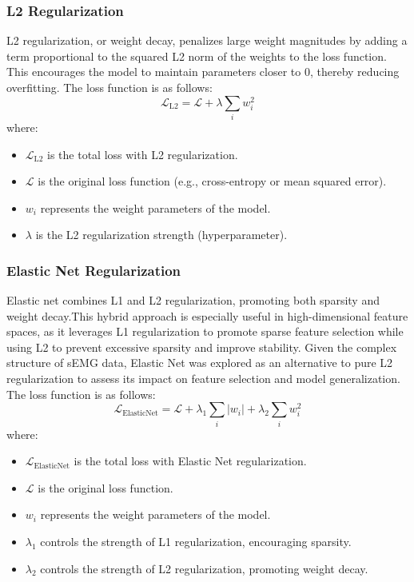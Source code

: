 \documentclass{article}
\begin{document}
\subsubsection{L2 Regularization}
L2 regularization, or weight decay, penalizes large weight magnitudes by adding a term proportional to the squared L2 norm of the weights to the loss function. This encourages the model to maintain parameters closer to 0, thereby reducing overfitting. The loss function is as follows:
\begin{equation}
\mathcal{L}_{\text{L2}} = \mathcal{L} + \lambda \sum_{i} w_i^2
\end{equation}
where:
\begin{itemize}
    \item \( \mathcal{L}_{\text{L2}} \) is the total loss with L2 regularization.
    \item \( \mathcal{L} \) is the original loss function (e.g., cross-entropy or mean squared error).
    \item \( w_i \) represents the weight parameters of the model.
    \item \( \lambda \) is the L2 regularization strength (hyperparameter).
\end{itemize}
\subsubsection{Elastic Net Regularization}
Elastic net combines L1 and L2 regularization, promoting both sparsity and weight decay.This hybrid approach is especially useful in high-dimensional feature spaces, as it leverages L1 regularization to promote sparse feature selection while using L2 to prevent excessive sparsity and improve stability.
Given the complex structure of sEMG data, Elastic Net was explored as an alternative to pure L2 regularization to assess its impact on feature selection and model generalization. The loss function is as follows:
\begin{equation}
\mathcal{L}_{\text{ElasticNet}} = \mathcal{L} + \lambda_1 \sum_{i} |w_i| + \lambda_2 \sum_{i} w_i^2
\end{equation}
where:
\begin{itemize}
    \item \( \mathcal{L}_{\text{ElasticNet}} \) is the total loss with Elastic Net regularization.
    \item \( \mathcal{L} \) is the original loss function.
    \item \( w_i \) represents the weight parameters of the model.
    \item \( \lambda_1 \) controls the strength of L1 regularization, encouraging sparsity.
    \item \( \lambda_2 \) controls the strength of L2 regularization, promoting weight decay.
\end{itemize}
\end{document}
